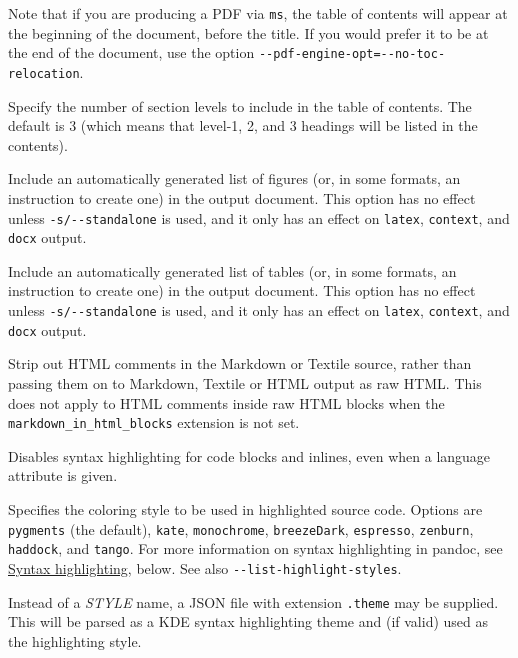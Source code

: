 \documentclass[
  b5paper
]{book}
\begin{document}
\begin{description}
Note that if you are producing a PDF via \texttt{ms}, the table of
contents will appear at the beginning of the document, before the title.
If you would prefer it to be at the end of the document, use the option
\texttt{-\/-pdf-engine-opt=-\/-no-toc-relocation}.
\item[\texttt{-\/-toc-depth=}\emph{NUMBER}]
Specify the number of section levels to include in the table of
contents. The default is 3 (which means that level-1, 2, and 3 headings
will be listed in the contents).
\item[\texttt{-\/-lof{[}=true\textbar{}false{]}},
\texttt{-\/-list-of-figures{[}=true\textbar{}false{]}}]
Include an automatically generated list of figures (or, in some formats,
an instruction to create one) in the output document. This option has no
effect unless \texttt{-s/-\/-standalone} is used, and it only has an
effect on \texttt{latex}, \texttt{context}, and \texttt{docx} output.
\item[\texttt{-\/-lot{[}=true\textbar{}false{]}},
\texttt{-\/-list-of-tables{[}=true\textbar{}false{]}}]
Include an automatically generated list of tables (or, in some formats,
an instruction to create one) in the output document. This option has no
effect unless \texttt{-s/-\/-standalone} is used, and it only has an
effect on \texttt{latex}, \texttt{context}, and \texttt{docx} output.
\item[\texttt{-\/-strip-comments{[}=true\textbar{}false{]}}]
Strip out HTML comments in the Markdown or Textile source, rather than
passing them on to Markdown, Textile or HTML output as raw HTML. This
does not apply to HTML comments inside raw HTML blocks when the
\texttt{markdown\_in\_html\_blocks} extension is not set.
\item[\texttt{-\/-no-highlight}]
Disables syntax highlighting for code blocks and inlines, even when a
language attribute is given.
\item[\texttt{-\/-highlight-style=}\emph{STYLE}\textbar{}\emph{FILE}]
Specifies the coloring style to be used in highlighted source code.
Options are \texttt{pygments} (the default), \texttt{kate},
\texttt{monochrome}, \texttt{breezeDark}, \texttt{espresso},
\texttt{zenburn}, \texttt{haddock}, and \texttt{tango}. For more
information on syntax highlighting in pandoc, see
\hyperref[syntax-highlighting]{Syntax highlighting}, below. See also
\texttt{-\/-list-highlight-styles}.

Instead of a \emph{STYLE} name, a JSON file with extension
\texttt{.theme} may be supplied. This will be parsed as a KDE syntax
highlighting theme and (if valid) used as the highlighting style.


\end{description}
\end{document}
